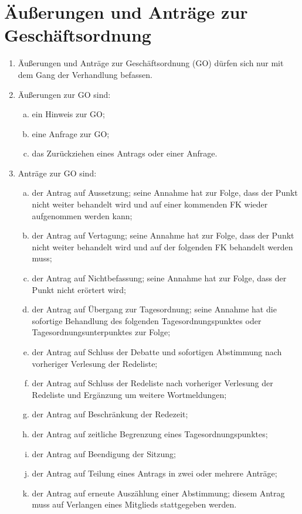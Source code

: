 \documentclass{article}
\begin{document}
\section{Äußerungen und Anträge zur Geschäftsordnung}
\begin{enumerate}[(1)]
    \item Äußerungen und Anträge zur Geschäftsordnung (GO) dürfen sich nur mit dem Gang der Verhandlung befassen.
    \item Äußerungen zur GO sind:
    \begin{enumerate}[a)]
        \item ein Hinweis zur GO;
        \item eine Anfrage zur GO;
        \item das Zurückziehen eines Antrags oder einer Anfrage.
    \end{enumerate}
    \item Anträge zur GO sind:
    \begin{enumerate}[a)]
        \item der Antrag auf Aussetzung; seine Annahme hat zur Folge, dass der Punkt nicht weiter behandelt wird und auf einer kommenden FK wieder aufgenommen werden kann;
        \item der Antrag auf Vertagung; seine Annahme hat zur Folge, dass der Punkt nicht weiter behandelt wird und auf der folgenden FK behandelt werden muss;
        \item der Antrag auf Nichtbefassung; seine Annahme hat zur Folge, dass der Punkt nicht erörtert wird;
        \item der Antrag auf Übergang zur Tagesordnung; seine Annahme hat die sofortige Behandlung des folgenden Tagesordnungspunktes oder Tagesordnungsunterpunktes zur Folge;
        \item der Antrag auf Schluss der Debatte und sofortigen Abstimmung nach vorheriger Verlesung der Redeliste;
        \item der Antrag auf Schluss der Redeliste nach vorheriger Verlesung der Redeliste und Ergänzung um weitere Wortmeldungen;
        \item der Antrag auf Beschränkung der Redezeit;
        \item der Antrag auf zeitliche Begrenzung eines Tagesordnungspunktes;
        \item der Antrag auf Beendigung der Sitzung;
        \item der Antrag auf Teilung eines Antrags in zwei oder mehrere Anträge;
        \item der Antrag auf erneute Auszählung einer Abstimmung; diesem Antrag muss auf Verlangen eines Mitglieds stattgegeben werden.

\end{enumerate}
\end{enumerate}
\end{document}
